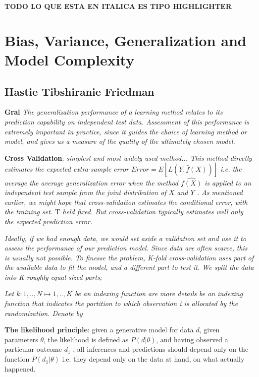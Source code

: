 \textbf{TODO LO QUE ESTA EN ITALICA ES TIPO HIGHLIGHTER}

\section{Bias, Variance, Generalization and Model Complexity}

\subsection{Hastie Tibshiranie Friedman}

\textbf{Gral}
\textit{The generalization performance of a learning method relates to its prediction capability on independent test data. Assessment of this performance is extremely important in practice, since it guides the choice of learning method or model, and gives us a measure of the quality of the ultimately chosen model.}

\textbf{Cross Validation}:  
\textit{simplest and most widely used method... This method directly estimates the expected extra-sample error
$Error = E[L(Y,\hat{f}(X))] $ i.e. the average the average generalization error when the method $\hat{f(X)}$ is applied to an independent test sample from the joint distribution of $X$ and $Y$ . As mentioned earlier, we might hope that cross-validation estimates the conditional error, with the training set. $\mathrm{T}$ held fixed. But cross-validation typically estimates well only the expected prediction error.}

\textit{Ideally, if we had enough data, we would set aside a validation set and use it to assess the performance of our prediction model. Since data are often scarce, this is usually not possible. To finesse the problem, K-fold cross-validation uses part of the available data to fit the model, and a different part to test it. We split the data into K roughly equal-sized parts; }

\textit{Let $k : {1,..,N} \mapsto {1, .., K}$ be an indexing function are more details be an indexing
function that indicates the partition to which observation i is allocated by the randomization. Denote by}

\textit{}

\textit{}


\textbf{The likelihood principle}: given a generative model for data $d$, given parameters $\theta$, the likelihood is defined as $P (d | \theta)$, and having observed a particular outcome $d_1$ , all inferences and predictions should depend only on the function $P(d_1 | \theta)$ i.e. they depend only on the data at hand, on what actually happened. 

